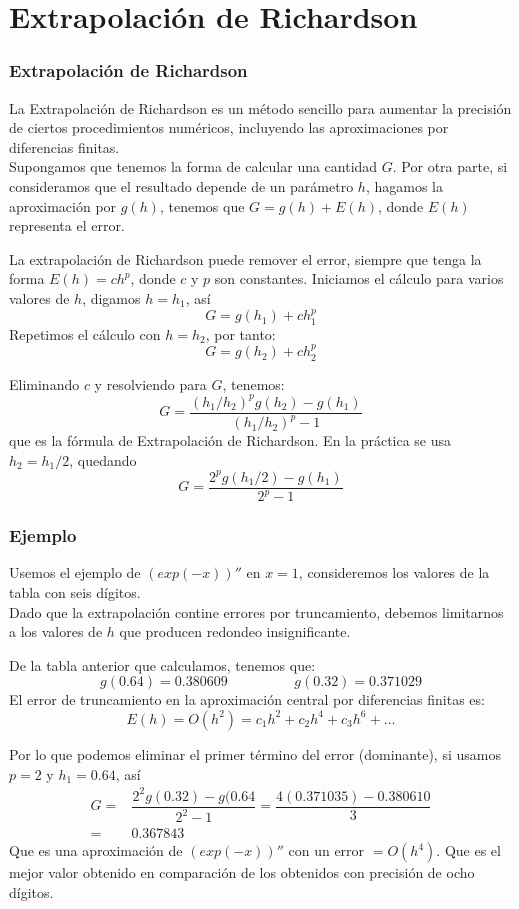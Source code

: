 \section{Extrapolación de Richardson}
\begin{frame}
\frametitle{Extrapolación de Richardson}
La Extrapolación de Richardson es un método sencillo para aumentar la precisión de ciertos procedimientos numéricos, incluyendo las aproximaciones por diferencias finitas.
\\
\bigskip
Supongamos que tenemos la forma de calcular una cantidad $G$. Por otra parte, si consideramos que el resultado depende de un parámetro $h$, hagamos la aproximación por $g(h)$, tenemos que $G=g(h)+E(h)$, donde $E(h)$ representa el error.
\end{frame}
\begin{frame}
La extrapolación de Richardson puede remover el error, siempre que tenga la forma $E(h) = ch^{p}$, donde $c$ y $p$ son constantes. Iniciamos el cálculo para varios valores de $h$, digamos $h=h_{1}$, así
\[ G = g(h_{1}) + c h_{1}^{p}\]
Repetimos el cálculo con $h=h_{2}$, por tanto:
\[ G = g(h_{2}) + c h_{2}^{p} \]
\end{frame}
\begin{frame}
Eliminando $c$ y resolviendo para $G$, tenemos:
\[ G = \dfrac{(h_{1}/h_{2})^{p} g(h_{2}) - g(h_{1})}{(h_{1}/h_{2})^{p}-1}\]
que es la fórmula de Extrapolación de Richardson. En la práctica se usa $h_{2} = h_{1}/2$, quedando
\[ G = \dfrac{2^{p} g(h_{1}/2) - g(h_{1})}{2^{p}-1}\]
\end{frame}
\begin{frame}
\frametitle{Ejemplo}
Usemos el ejemplo de $(exp(-x))''$ en $x=1$, consideremos los valores de la tabla con seis dígitos.
\\
\bigskip
Dado que la extrapolación contine errores por truncamiento, debemos limitarnos a los valores de $h$ que producen redondeo insignificante.
\end{frame}
\begin{frame}
De la tabla anterior que calculamos, tenemos que:
\[ g(0.64) = 0.380609 \hspace{2cm} g(0.32) = 0.371029\]
El error de truncamiento en la aproximación central por diferencias finitas es:
\[E(h) = O(h^{2}) = c_{1}h^{2} + c_{2}h^{4} + c_{3}h^{6} + \ldots\]
\end{frame}
\begin{frame}
Por lo que podemos eliminar el primer término del error (dominante), si usamos $p=2$ y $h_{1}=0.64$, así
\[ \begin{split}
G =& \dfrac{2^{2}g(0.32)- g(0.64}{2^{2}-1} = \dfrac{4(0.371035)-0.380610}{3} \\
 =& 0.367843
\end{split} \]
Que es una aproximación de $(exp(-x))''$ con un error $=O(h^{4})$. Que es el mejor valor obtenido en comparación de los obtenidos con precisión de ocho dígitos.
\end{frame}
